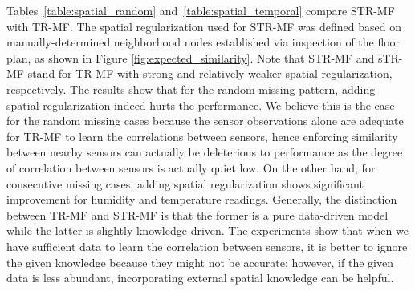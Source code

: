 
Tables~\ref{table:spatial_random} and~\ref{table:spatial_temporal} compare STR-MF with TR-MF.
The spatial regularization used for STR-MF was defined based on manually-determined neighborhood nodes established via inspection of the floor plan, as shown in Figure \ref{fig:expected_similarity}.
Note that STR-MF and sTR-MF stand for TR-MF with strong and relatively weaker spatial regularization, respectively.
The results show that for the random missing pattern, adding spatial regularization indeed hurts the performance.
We believe this is the case for the random missing cases because the sensor observations alone are adequate for TR-MF to learn the correlations between sensors, hence enforcing similarity between nearby sensors can actually be deleterious to performance as the degree of correlation between sensors is actually quiet low.
On the other hand, for consecutive missing cases, adding spatial regularization shows significant improvement for humidity and temperature readings.
Generally, the distinction between TR-MF and STR-MF is that the former is a pure data-driven model while the latter is slightly knowledge-driven.
The experiments show that when we have sufficient data to learn the correlation between sensors, it is better to ignore the given knowledge because they might not be accurate; however, if the given data is less abundant, incorporating external spatial knowledge can be helpful.

